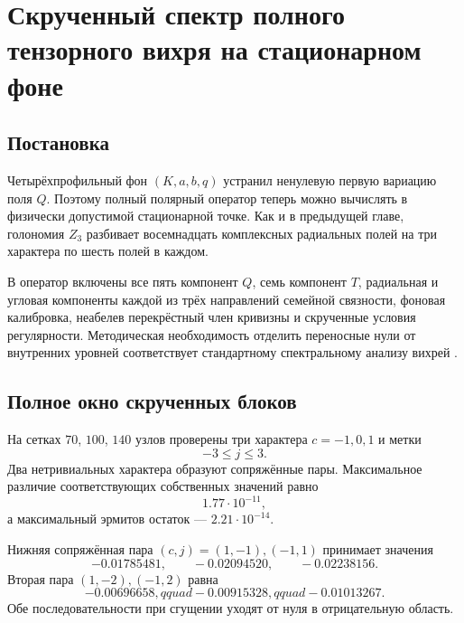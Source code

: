 \chapter{Скрученный спектр полного тензорного вихря на стационарном фоне}
\label{ch:v6-bosonic-defect-full-tensor-stationary-twisted-spectrum-gate}

\section{Постановка}

Четырёхпрофильный фон $(K,a,b,q)$ устранил ненулевую первую вариацию поля
$Q$. Поэтому полный полярный оператор теперь можно вычислять в физически
допустимой стационарной точке. Как и в предыдущей главе, голономия $Z_3$
разбивает восемнадцать комплексных радиальных полей на три характера по шесть
полей в каждом.

В оператор включены все пять компонент $Q$, семь компонент $T$, радиальная и
угловая компоненты каждой из трёх направлений семейной связности, фоновая
калибровка, неабелев перекрёстный член кривизны и скрученные условия
регулярности. Методическая необходимость отделить переносные нули от
внутренних уровней соответствует стандартному спектральному анализу вихрей
\cite{stationary-spectrum-alonso,stationary-spectrum-forgacs}.

\section{Полное окно скрученных блоков}

На сетках $70$, $100$, $140$ узлов проверены три характера
$c=-1,0,1$ и метки
\begin{equation}
 -3\le j\le3.
\end{equation}
Два нетривиальных характера образуют сопряжённые пары. Максимальное различие
соответствующих собственных значений равно
\begin{equation}
 1.77\cdot10^{-11},
\end{equation}
а максимальный эрмитов остаток --- $2.21\cdot10^{-14}$.

Нижняя сопряжённая пара $(c,j)=(1,-1),(-1,1)$ принимает значения
\begin{equation}
 -0.01785481,\qquad -0.02094520,\qquad -0.02238156.
\end{equation}
Вторая пара $(1,-2),(-1,2)$ равна
\begin{equation}
 -0.00696658,qquad -0.00915328,qquad -0.01013267.
\end{equation}
Обе последовательности при сгущении уходят от нуля в отрицательную область.

